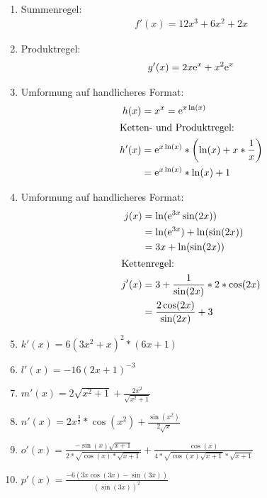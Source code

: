 \begin{lsg}{}
	\begin{multicols}{2}
		\begin{enumerate}
			\item Summenregel: \begin{align*}
			f'(x)=12x^3+6x^2+2x
			\end{align*}
			\item Produktregel: \begin{align*}
			g'(x)=2x\mathrm{e}^x+x^2\mathrm{e}^x
			\end{align*}
			\item Umformung auf handlicheres Format: \begin{align*}
		    h(x)&= x^x= \mathrm{e}^{x\ln(x)}\\
		    \intertext{Ketten- und Produktregel: }
				h'(x)&=\mathrm{e}^{x\ln(x)}* \left(\ln(x)+x*\frac{1}{x}\right) \\
				&= \mathrm{e}^{x\ln(x)}*\ln(x)+1
		  \end{align*}
		  \item Umformung auf handlicheres Format: \begin{align*}
		    j(x)&= \ln(\mathrm{e}^{3x}\sin(2x))\\
				&= \ln(\mathrm{e}^{3x}) + \ln(\sin(2x)) \\
				&= 3x + \ln(\sin(2x))\\
				\intertext{Kettenregel:}
		    j'(x)&=3+\frac{1}{\sin(2x)} * 2*\cos(2x) \\
				&= \frac{2\cos(2x)}{\sin(2x)}+3
		  \end{align*}
			\item $k'(x) = 6(3x^2+x)^2*(6x+1)$
	    \item $l'(x) = -16(2x+1)^{-3}$
	    \item $m'(x) = 2\sqrt{x^2+1}+\frac{2x^2}{\sqrt{x^2+1}}$
	    \item $n'(x) = 2x^{\frac 3 2}*\cos(x^2)+\frac{\sin(x^2)}{2\sqrt x}$
	    \item $o'(x) = \frac{-\sin(x)\sqrt{x+1}}{2*\sqrt{\cos(x)*\sqrt{x+1}}}+\frac{\cos(x)}{4*\sqrt{\cos(x)\sqrt{x+1}}*\sqrt{x+1}}$
	    \item $p'(x) = \frac{-6\left(3x\cos(3x)-\sin(3x)\right)}{\left(\sin(3x)\right)^2}$
		\end{enumerate}
	\end{multicols}
\end{lsg}



